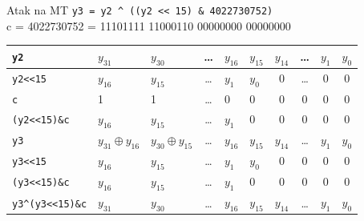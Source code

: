 \documentclass{mp}
\newcommand{\xor}{\oplus}
\begin{document}
\begin{frame}{Atak na MT}
\texttt{y3 = y2 \^{} ((y2 << 15) \& 4022730752)} \\
c = 4022730752 = 11101111 11000110 00000000 00000000 \\
\setlength\tabcolsep{3pt}
\small
\begin{tabular}{l||p{1.3cm}|p{1.3cm}|c|p{1.3cm}|p{1.3cm}|c|c|c|c|}
\hline
\texttt{y2} & $y_{31}$ & $y_{30}$ & \ldots & $y_{16}$ & $y_{15}$ & $y_{14}$ & \ldots & $y_1$ & $y_0$ \\
\hline
\texttt{y2<<15} & $y_{16}$ & $y_{15}$ & \ldots & $y_{1}$ & $y_{0}$ & 0 & \ldots & 0 & 0 \\
\hline
\pause
\texttt{c} & 1 & 1 & \ldots & 0 & 0 & 0 & 0 & 0 & 0 \\
\hline
\pause
\texttt{(y2<<15)\&c} & $y_{16}$ & $y_{15}$ & \ldots & $y_{1}$ & 0 & 0 & 0 & 0 & 0 \\
\hline
\pause
\texttt{y3} & $y_{31}\xor y_{16}$ & $y_{30}\xor y_{15}$ & \ldots & $y_{16}$ & $y_{15}$ & $y_{14}$ & \ldots & $y_1$ & $y_0$ \\
\hline
\hline
\pause
\texttt{y3<<15} & $y_{16}$ & $y_{15}$ & \ldots & $y_1$ & $y_0$ & 0 & 0 & 0 & 0 \\
\hline
\pause
\texttt{(y3<<15)\&c} & $y_{16}$ & $y_{15}$ & \ldots & $y_1$ & $0$ & 0 & 0 & 0 & 0 \\
\hline
\pause
\texttt{y3\^{}(y3<<15)\&c} & $y_{31}$ & $y_{30}$ & \ldots & $y_{16}$ & $y_{15}$ & $y_{14}$ & \ldots & $y_1$ & $y_0$ \\
\hline
\end{tabular}
\end{frame}
\end{document}
